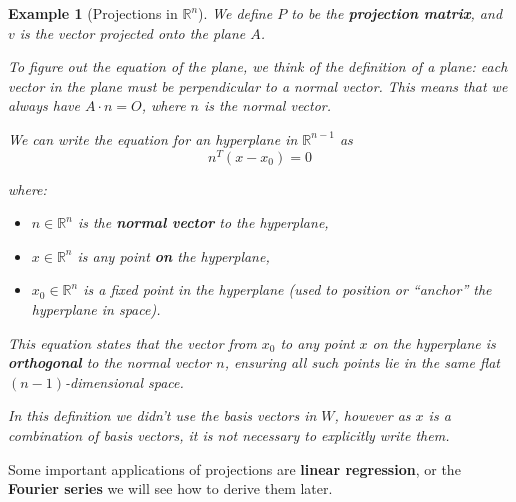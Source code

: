 \documentclass{book}
\newtheorem{example}{Example}[chapter]
\begin{document}
\begin{example}[Projections in $\mathbb{R}^{n}$]
    We define $P$ to be the \textbf{projection matrix}, and $v$ is the vector
    projected onto the plane $A$.

    To figure out the equation of the plane, we think of the definition of a plane:
    each vector in the plane must be perpendicular to a normal vector. This means
    that we always have $A\cdot n = O$, where $n$ is the normal vector.

    We can write the equation for an hyperplane in $\mathbb{R}^{n-1}$ as
    \begin{equation}
        n^{T}(x-x_0) = 0
    \end{equation}

    where:
    \begin{itemize}
        \item $n \in \mathbb{R}^n$ is the \textbf{normal vector} to the hyperplane,
        \item $x \in \mathbb{R}^n$ is any point \textbf{on} the hyperplane,
        \item $x_0 \in \mathbb{R}^n$ is a fixed point in the hyperplane (used to position or ``anchor'' the hyperplane in space).
    \end{itemize}

    This equation states that the vector from $x_0$ to any point $x$ on the
    hyperplane is \textbf{orthogonal} to the normal vector $n$, ensuring all such
    points lie in the same flat $(n-1)$-dimensional space.

    In this definition we didn't use the basis vectors in $W$, however as $x$ is a
    combination of basis vectors, it is not necessary to explicitly write them.
\end{example}

Some important applications of projections are \textbf{linear regression}, or
the \textbf{Fourier series} we will see how to derive them later.

\end{document}
